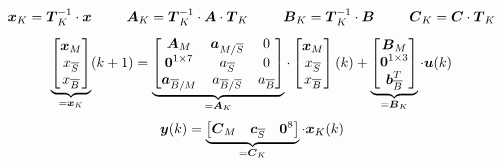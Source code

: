 \begin{equation}
\boldsymbol{x}_K = \boldsymbol{T}^{-1}_K\cdot \boldsymbol{x}\hspace{25pt} \boldsymbol{A}_K = \boldsymbol{T}^{-1}_K\cdot \boldsymbol{A}\cdot \boldsymbol{T}_K \hspace{25pt} \boldsymbol{B}_K = \boldsymbol{T}^{-1}_K\cdot \boldsymbol{B} \hspace{25pt} \boldsymbol{C}_K = \boldsymbol{C}\cdot \boldsymbol{T}_K
\end{equation}
\begin{equation}
\underbrace{\begin{bmatrix}
\boldsymbol{x}_M \\ x_{\overline{S}} \\ x_{\overline{B}}
\end{bmatrix}}_{= \boldsymbol{x}_K}(k+1) = 
\underbrace{\begin{bmatrix}
\boldsymbol{A}_M & \boldsymbol{a}_{M/\overline{S}} & 0 \\
\boldsymbol{0}^{1\times 7} & a_{\overline{S}} & 0 \\
\boldsymbol{a}_{\overline{B}/M} & a_{\overline{B}/\overline{S}} & a_{\overline{B}}
\end{bmatrix}}_{= \boldsymbol{A}_K}\cdot \begin{bmatrix}
\boldsymbol{x}_M \\ x_{\overline{S}} \\ x_{\overline{B}}
\end{bmatrix}(k) + 
\underbrace{\begin{bmatrix}
\boldsymbol{B}_M \\ \boldsymbol{0}^{1\times 3} \\ \boldsymbol{b}^{T}_{\overline{B}}
\end{bmatrix}}_{=\boldsymbol{B}_K}\cdot \boldsymbol{u}(k)
\end{equation}
\begin{equation}
\boldsymbol{y}(k) = \underbrace{\begin{bmatrix}
\boldsymbol{C}_M  & \boldsymbol{c}_{\overline{S}} & \boldsymbol{0}^8
\end{bmatrix}}_{=\boldsymbol{C}_K}\cdot \boldsymbol{x}_K(k)
\end{equation}
